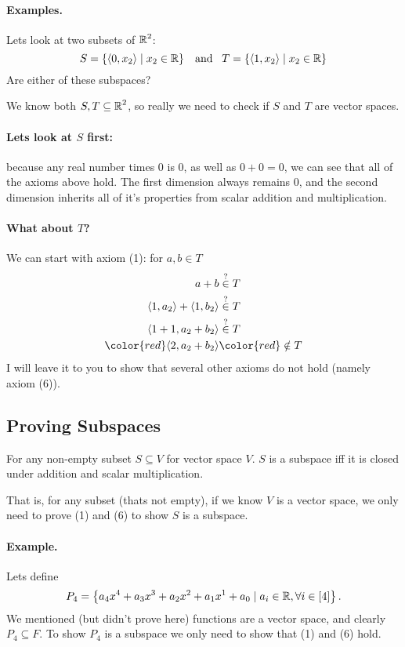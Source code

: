 \paragraph{Examples.} 
Lets look at two subsets of $\operatorname{\mathbb{R}}^2$:
\[S = \left\{\left\langle 0, x_2\right\rangle \mid x_2 \in \operatorname{\mathbb{R}}\right\} \;\;\;\textnormal{and}\;\;\;
T = \left\{\left\langle 1, x_2\right\rangle \mid x_2 \in \operatorname{\mathbb{R}}\right\}\]
Are either of these subspaces? 

We know both $S, T \subseteq \operatorname{\mathbb{R}}^2$, so really we need to check if $S$ and $T$ are vector spaces. 

\paragraph{Lets look at $S$ first: }
because any real number times 0 is 0, as well as $0+0=0$, we can see that all of the axioms above hold. 
The first dimension always remains $0$, and the second dimension inherits all of it's properties from scalar addition and multiplication. 

\paragraph{What about $T$? }
We can start with axiom (1): 
for $a,b \in T$
\[\begin{aligned}
a + b & \stackrel{?}{\in}  T\\
\langle 1,a_2\rangle + \langle 1, b_2\rangle & \stackrel{?}{\in}  T\\
\langle 1+1,a_2+b_2\rangle & \stackrel{?}{\in}  T\\
\color{red} \langle 2,a_2+b_2\rangle& \color{red}\notin T\\
\end{aligned}\]
I will leave it to you to show that several other axioms do not hold (namely axiom (6)). 

\subsection{Proving Subspaces}
For any non-empty subset $S\subseteq V$ for vector space $V$. 
$S$ is a subspace iff it is closed under addition and scalar multiplication. 

That is, for any subset (thats not empty), if we know $V$ is a vector space, we only need to prove (1) and (6) to show $S$ is a subspace. 

\paragraph{Example.}
Lets define \[P_4 = \left\{a_4x^4 + a_3x^3 + a_2x^2 + a_1x^1 + a_0 \mid a_i\in \operatorname{\mathbb{R}}, \forall i \in [4] \right\}.\]
We mentioned (but didn't prove here) functions are a vector space, and clearly $P_4 \subseteq F$. 
To show $P_4$ is a subspace we only need to show that (1) and (6) hold. 

